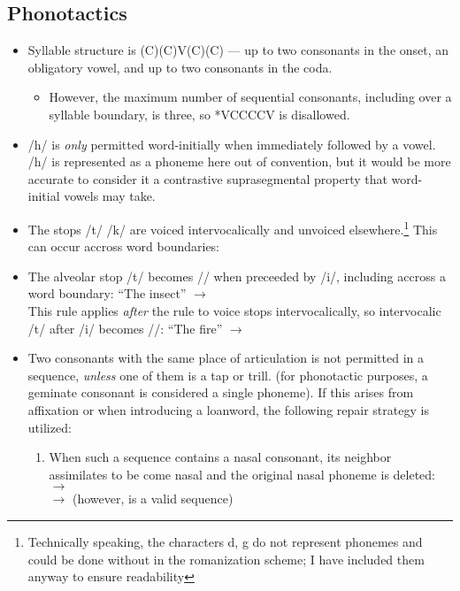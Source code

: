 \documentclass{article}
\begin{document}
\subsection{Phonotactics}
\begin{itemize}
  \item Syllable structure is (C)(C)V(C)(C) --- up to two consonants in the onset, an obligatory vowel, and up to two consonants in the coda.
  \begin{itemize}
    \item However, the maximum number of sequential consonants, including over a syllable boundary, is three, so *VCCCCV is disallowed.

  \end{itemize}
  \item /h/ is \textit{only} permitted word-initially when immediately followed by a vowel. /h/ is represented as a phoneme here out of convention, but it would be more accurate to consider it a contrastive suprasegmental property that word-initial vowels may take.

  \item The stops /t/ /k/ are voiced intervocalically and unvoiced elsewhere.\footnote{Technically speaking, the characters \textlangle{} d, g\textrangle{} do not represent phonemes and could be done without in the romanization scheme; I have included them anyway to ensure readability} This can occur accross word boundaries:


  \item The alveolar stop /t/ becomes // when preceeded by /i/, including accross a word boundary:  \textit{} ``The insect'' $\rightarrow$ \textipa{[Si Tre]} \\ This rule applies \textit{after} the rule to voice stops intervocalically, so intervocalic /t/ after /i/ becomes //:
  \textit{} ``The fire'' $\rightarrow$ \textipa{[Si DA:Si]} \\


  \item Two consonants with the same place of articulation is not permitted in a sequence, \textit{unless} one of them is a tap or trill.  (for phonotactic purposes, a geminate consonant is considered a single phoneme). If this arises from affixation or when introducing a loanword, the following repair strategy is utilized:
    \begin{enumerate}
      \item When such a sequence contains a nasal consonant, its neighbor assimilates to be come nasal and the original nasal phoneme is deleted: \\ \textit{} $\rightarrow$ \textit{} \\ \textit{} $\rightarrow$ \textit{} (however, \textit{} is a valid sequence)


\end{enumerate}
\end{itemize}
\end{document}
